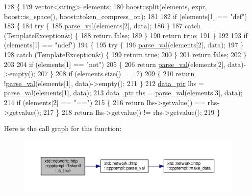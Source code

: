 \begin{DoxyCode}
178 \{
179   vector<string> elements;
180   boost::split(elements, expr, boost::is\_space(), boost::token\_compress\_on);
181 
182   \textcolor{keywordflow}{if} (elements[1] == \textcolor{stringliteral}{"def"})
183   \{
184     \textcolor{keywordflow}{try} \{
185       \hyperlink{namespacextd_1_1network_1_1http_1_1cpptempl_af79d10d06cd5bc9ce629bb2d21fbcfd6}{parse\_val}(elements[2], data);
186     \}
187     \textcolor{keywordflow}{catch} (TemplateException&) \{
188       \textcolor{keywordflow}{return} \textcolor{keyword}{false};
189     \}
190     \textcolor{keywordflow}{return} \textcolor{keyword}{true};
191   \}
192 
193   \textcolor{keywordflow}{if} (elements[1] == \textcolor{stringliteral}{"ndef"})
194   \{
195     \textcolor{keywordflow}{try} \{
196       \hyperlink{namespacextd_1_1network_1_1http_1_1cpptempl_af79d10d06cd5bc9ce629bb2d21fbcfd6}{parse\_val}(elements[2], data);
197     \}
198     \textcolor{keywordflow}{catch} (TemplateException&) \{
199       \textcolor{keywordflow}{return} \textcolor{keyword}{true};
200     \}
201     \textcolor{keywordflow}{return} \textcolor{keyword}{false};
202   \}
203 
204   \textcolor{keywordflow}{if} (elements[1] == \textcolor{stringliteral}{"not"})
205   \{
206     \textcolor{keywordflow}{return} \hyperlink{namespacextd_1_1network_1_1http_1_1cpptempl_af79d10d06cd5bc9ce629bb2d21fbcfd6}{parse\_val}(elements[2], data)->empty();
207   \}
208   \textcolor{keywordflow}{if} (elements.size() == 2)
209   \{
210     \textcolor{keywordflow}{return} !\hyperlink{namespacextd_1_1network_1_1http_1_1cpptempl_af79d10d06cd5bc9ce629bb2d21fbcfd6}{parse\_val}(elements[1], data)->empty();
211   \}
212   \hyperlink{namespacextd_1_1network_1_1http_1_1cpptempl_ad2f49991f1902699a98cf62bf0ae7ce6}{data\_ptr} lhs = \hyperlink{namespacextd_1_1network_1_1http_1_1cpptempl_af79d10d06cd5bc9ce629bb2d21fbcfd6}{parse\_val}(elements[1], data);
213   \hyperlink{namespacextd_1_1network_1_1http_1_1cpptempl_ad2f49991f1902699a98cf62bf0ae7ce6}{data\_ptr} rhs = \hyperlink{namespacextd_1_1network_1_1http_1_1cpptempl_af79d10d06cd5bc9ce629bb2d21fbcfd6}{parse\_val}(elements[3], data);
214   \textcolor{keywordflow}{if} (elements[2] == \textcolor{stringliteral}{"=="})
215   \{
216     \textcolor{keywordflow}{return} lhs->getvalue() == rhs->getvalue();
217   \}
218   \textcolor{keywordflow}{return} lhs->getvalue() != rhs->getvalue();
219 \}
\end{DoxyCode}


Here is the call graph for this function\-:
\nopagebreak
\begin{figure}[H]
\begin{center}
\leavevmode
\includegraphics[width=350pt]{classxtd_1_1network_1_1http_1_1cpptempl_1_1TokenIf_aa803ceac00459d9ceae20b64e4e366e7_cgraph}
\end{center}
\end{figure}




